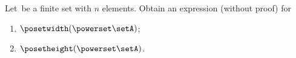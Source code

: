 \vfill
\begin{gradedexercise}
    \label{ex:MeasurePowerPoset}

    Let~\setA be a finite set with $n$ elements.
    Obtain an expression (without proof) for
    \begin{enumerate}
        \item $\posetwidth(\powerset \setA)$;
        \item $\posetheight(\powerset \setA)$.
    \end{enumerate}
\end{gradedexercise}

